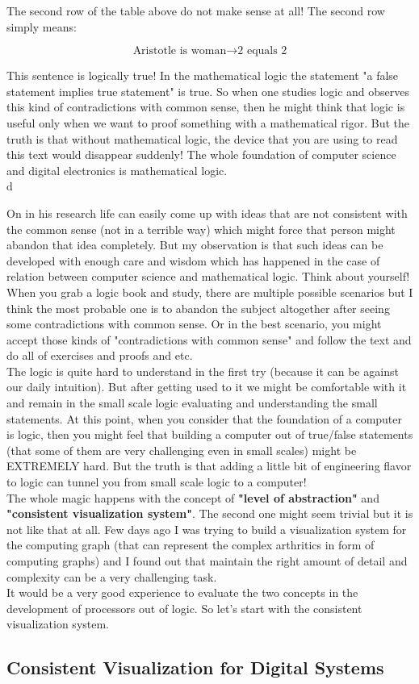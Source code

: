 The second row of the table above do not make sense at all! The second row simply means:


\begin{equation*}
	\text{Aristotle is woman} \rightarrow \text{2 equals 2}
\end{equation*}

This sentence is logically true! In the mathematical logic the statement "a false statement implies true statement" is true. So when one studies logic and observes this kind of contradictions with common sense, then he might think that logic is useful only when we want to proof something with a mathematical rigor. But the truth is that without mathematical logic, the device that you are using to read this text would disappear suddenly! The whole foundation of computer science and digital electronics is mathematical logic.\\d

On in his research life can easily come up with ideas that are not consistent with the common sense (not in a terrible way) which might force that person might abandon that idea completely. But my observation is that such ideas can be developed with enough care and wisdom which has happened in the case of relation between computer science and mathematical logic. Think about yourself! When you grab a logic book and study, there are multiple possible scenarios but I think the most probable one is to abandon the subject altogether after seeing some contradictions with common sense. Or in the best scenario, you might accept those kinds of "contradictions with common sense" and follow the text and do all of exercises and proofs and etc. \\

The logic is quite hard to understand in the first try (because it can be against our daily intuition). But after getting used to it we might be comfortable with it and remain in the small scale logic evaluating and understanding the small statements. At this point, when you consider that the foundation of a computer is logic, then you might feel that building a computer out of true/false statements (that some of them are very challenging even in small scales) might be EXTREMELY hard. But the truth is that adding a little bit of engineering flavor to logic can tunnel you from small scale logic to a computer! \\


The whole magic happens with the concept of \textbf{"level of abstraction"} and \textbf{"consistent visualization system"}. The second one might seem trivial but it is not like that at all. Few days ago I was trying to build a visualization system for the computing graph (that can represent the complex arthritics in form of computing graphs) and I found out that maintain the right amount of detail and complexity can be a very challenging task. \\


It would be a very good experience to evaluate the two concepts in the development of processors out of logic. So let's start with the consistent visualization system.

\subsection{Consistent Visualization for Digital Systems }






